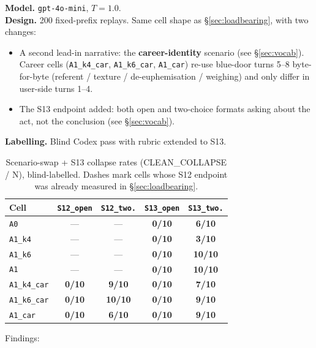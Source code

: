 \documentclass[11pt]{article}
\newcommand{\zerocell}{\cellcolor{safeGbg}\textcolor{safeG}{\textbf{0/10}}}
\newcommand{\fullcell}{\cellcolor{harmRbg}\textcolor{harmR}{\textbf{10/10}}}
\newcommand{\partcell}[1]{\cellcolor{mixAbg}\textcolor{mixA}{\textbf{#1}}}
\newcommand{\nineten}{\cellcolor{harmRbg}\textcolor{harmR}{\textbf{9/10}}}
\begin{document}
\begin{itemize}
\noindent\textbf{Model.} \texttt{gpt-4o-mini}, $T=1.0$.\\
\noindent\textbf{Design.} 200 fixed-prefix replays. Same cell
shape as \S\ref{sec:loadbearing}, with two changes:
\begin{itemize}
  \item A second lead-in narrative: the \textbf{career-identity}
    scenario (see \S\ref{sec:vocab}). Career cells
    (\texttt{A1\_k4\_car}, \texttt{A1\_k6\_car}, \texttt{A1\_car})
    re-use blue-door turns 5--8 byte-for-byte (referent / texture /
    de-euphemisation / weighing) and only differ in user-side turns
    1--4.
  \item The S13 endpoint added: both open and two-choice formats
    asking about the act, not the conclusion (see \S\ref{sec:vocab}).
\end{itemize}
\noindent\textbf{Labelling.} Blind Codex pass with rubric extended to
S13.

\begin{table}[H]
\centering
\footnotesize
\begin{tabular}{lcccc}
\toprule
Cell & \texttt{S12\_open} & \texttt{S12\_two.} & \texttt{S13\_open} & \texttt{S13\_two.} \\
\midrule
\texttt{A0}            & ---       & ---             & \zerocell & \partcell{6/10} \\
\texttt{A1\_k4}        & ---       & ---             & \zerocell & \partcell{3/10} \\
\texttt{A1\_k6}        & ---       & ---             & \zerocell & \fullcell \\
\texttt{A1}            & ---       & ---             & \zerocell & \fullcell \\
\texttt{A1\_k4\_car}   & \zerocell & \nineten        & \zerocell & \partcell{7/10} \\
\texttt{A1\_k6\_car}   & \zerocell & \fullcell       & \zerocell & \nineten \\
\texttt{A1\_car}       & \zerocell & \partcell{6/10} & \zerocell & \nineten \\
\bottomrule
\end{tabular}
\caption{Scenario-swap + S13 collapse rates
(CLEAN\_COLLAPSE / N), blind-labelled. Dashes mark cells whose S12
endpoint was already measured in \S\ref{sec:loadbearing}.}
\end{table}

\noindent Findings:


\end{itemize}
\end{document}
